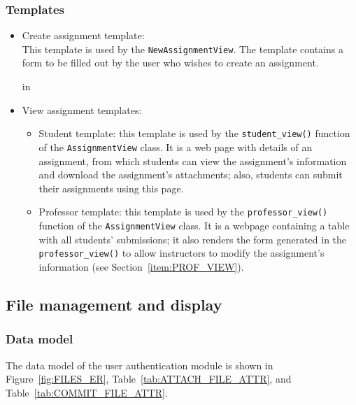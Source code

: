 \subsubsection{Templates}
\begin{itemize}
    \item Create assignment template: \\
    This template is used by the \texttt{NewAssignmentView}.
    The template
    contains a form to be filled out by the user who wishes to create an
    assignment.

     in

    \item View assignment templates:
    \begin{itemize}
        \item Student template: 
            this template is used by the \texttt{student\_view()} function
            of the \texttt{AssignmentView} class. It is
            a web page with details of an assignment, from
            which students can view the assignment's information and
            download the assignment's attachments; also, students can submit
            their assignments using this page.
        \item Professor template:
            this template is used by the \texttt{professor\_view()} function
            of the \texttt{AssignmentView} class. It is a webpage
            containing a table with all students' submissions; it also renders
            the form generated in the \texttt{professor\_\-view()} to allow
            instructors to modify the assignment's information
            (see Section~\ref{item:PROF_VIEW}).
    \end{itemize}
\end{itemize}





\subsection{File management and display}

\subsubsection{Data model}
The data model of the user authentication module is shown in
Figure~\ref{fig:FILES_ER}, Table~\ref{tab:ATTACH_FILE_ATTR},
and Table~\ref{tab:COMMIT_FILE_ATTR}. \medskip

